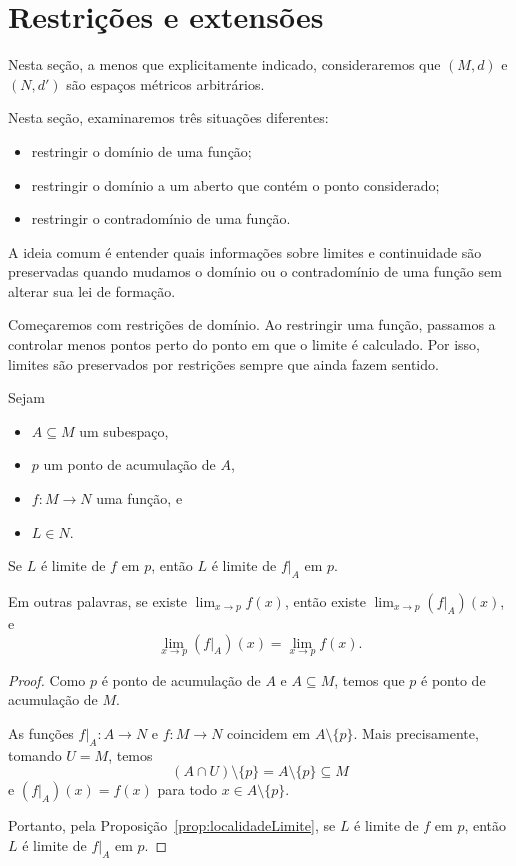 \section{Restrições e extensões}
Nesta seção, a menos que explicitamente indicado, consideraremos que $(M, d)$ e $(N, d')$ são espaços métricos arbitrários.

Nesta seção, examinaremos três situações diferentes:
\begin{itemize}
    \item restringir o domínio de uma função;
    \item restringir o domínio a um aberto que contém o ponto considerado;
    \item restringir o contradomínio de uma função.
\end{itemize}

A ideia comum é entender quais informações sobre limites e continuidade são preservadas quando mudamos o domínio ou o contradomínio de uma função sem alterar sua lei de formação.

Começaremos com restrições de domínio.
Ao restringir uma função, passamos a controlar menos pontos perto do ponto em que o limite é calculado.
Por isso, limites são preservados por restrições sempre que ainda fazem sentido.

\begin{proposition}\label{prop:limiteRestricaoDominio}
    Sejam
    \begin{itemize}
        \item $A\subseteq M$ um subespaço,
        \item $p$ um ponto de acumulação de $A$,
        \item $f: M \to N$ uma função, e
        \item $L\in N$.
    \end{itemize}

    Se $L$ é limite de $f$ em $p$, então $L$ é limite de $f|_A$ em $p$.

    Em outras palavras, se existe $\lim_{x\to p} f(x)$, então existe $\lim_{x\to p} (f|_A)(x)$, e
    \[
        \lim_{x\to p} (f|_A)(x) = \lim_{x\to p} f(x).
    \]
\end{proposition}

\begin{proof}
    Como $p$ é ponto de acumulação de $A$ e $A\subseteq M$, temos que $p$ é ponto de acumulação de $M$.

    As funções $f|_A:A\to N$ e $f:M\to N$ coincidem em $A\setminus\{p\}$.
    Mais precisamente, tomando $U=M$, temos
    \[
        (A\cap U)\setminus\{p\}=A\setminus\{p\}\subseteq M
    \]
    e $(f|_A)(x)=f(x)$
    para todo $x\in A\setminus\{p\}$.

    Portanto, pela Proposição~\ref{prop:localidadeLimite}, se $L$ é limite de $f$ em $p$, então $L$ é limite de $f|_A$ em $p$.
\end{proof}

